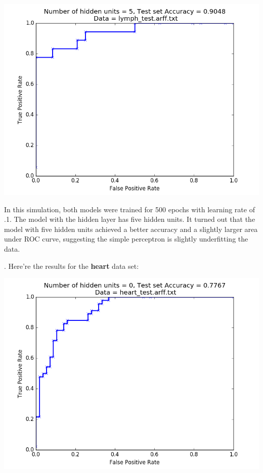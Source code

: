 \documentclass[paper=a4, fontsize=11pt]{scrartcl} %
\numberwithin{equation}{section} %
\numberwithin{figure}{section} %
\numberwithin{table}{section} %
\begin{document}
\begin{center}
\includegraphics[scale=.45]{pics/roc_hidden.png}
\end{center}

In this simulation, both models were trained for 500 epochs with learning rate of .1. The model with the hidden layer has five hidden units. It turned out that the model with five hidden units achieved a better accuracy and a slightly larger area under ROC curve, suggesting the simple perceptron is slightly underfitting the data. 

. Here're the results for the \textbf{heart} data set: 
\begin{center}
\includegraphics[scale=.45]{pics/roc_noHidden_heart.png}
\end{center}
\end{document}
